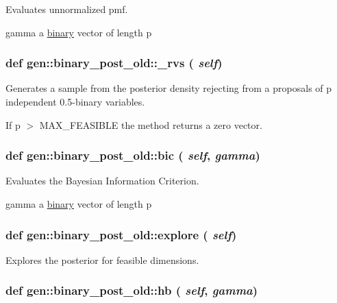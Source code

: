 Evaluates unnormalized pmf. 

gamma a \hyperlink{classgen_1_1binary}{binary} vector of length p \hypertarget{classgen_1_1binary__post__old_8a67ce87638a15897ced3053c461e881}{
\subsubsection[{\_\-rvs}]{\setlength{\rightskip}{0pt plus 5cm}def gen::binary\_\-post\_\-old::\_\-rvs ( {\em self})}}
\label{classgen_1_1binary__post__old_8a67ce87638a15897ced3053c461e881}


Generates a sample from the posterior density rejecting from a proposals of p independent 0.5-binary variables. 

If p $>$ MAX\_\-FEASIBLE the method returns a zero vector. \hypertarget{classgen_1_1binary__post__old_9ff0bcd17b79b57d04fa262c34074ac7}{
\subsubsection[{bic}]{\setlength{\rightskip}{0pt plus 5cm}def gen::binary\_\-post\_\-old::bic ( {\em self}, \/   {\em gamma})}}
\label{classgen_1_1binary__post__old_9ff0bcd17b79b57d04fa262c34074ac7}


Evaluates the Bayesian Information Criterion. 

gamma a \hyperlink{classgen_1_1binary}{binary} vector of length p \hypertarget{classgen_1_1binary__post__old_4529d5812825affd59fabf1d87879584}{
\subsubsection[{explore}]{\setlength{\rightskip}{0pt plus 5cm}def gen::binary\_\-post\_\-old::explore ( {\em self})}}
\label{classgen_1_1binary__post__old_4529d5812825affd59fabf1d87879584}


Explores the posterior for feasible dimensions. 

\hypertarget{classgen_1_1binary__post__old_023a5d03ed9651fb97b76c933b23663d}{
\subsubsection[{hb}]{\setlength{\rightskip}{0pt plus 5cm}def gen::binary\_\-post\_\-old::hb ( {\em self}, \/   {\em gamma})}}
\label{classgen_1_1binary__post__old_023a5d03ed9651fb97b76c933b23663d}


